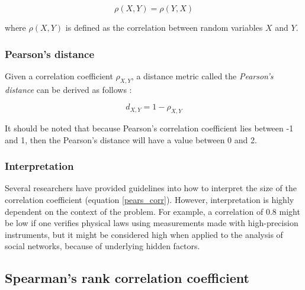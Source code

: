 $$ \rho(X,Y) = \rho(Y,X) $$

where $\rho(X,Y)$ is defined as the correlation between random variables $X$ and $Y$.

\subsubsection{Pearson's distance}

Given a correlation coefficient $ \rho_{X,Y} $, a distance metric
called the \emph{Pearson's distance} can be derived as
follows \cite{fulekar2009bioinformatics}:

$$ d_{X,Y} = 1- \rho_{X,Y} $$

It should be noted that because Pearson's correlation coefficient lies between
-1 and 1, then the Pearson's distance will have a value between 0 and 2.

\subsubsection{Interpretation}

Several researchers have provided guidelines into how
to interpret the size of the correlation coefficient \cite{cohen1988statistical} 
(equation \ref{pears_corr}). However, interpretation is highly dependent on the context of the problem. For
example, a correlation of 0.8 might be low if one verifies physical laws using
measurements made with high-precision instruments, but it might be considered
high when applied to the analysis of social networks, because of underlying hidden
factors.

\subsection{Spearman's rank correlation coefficient}





